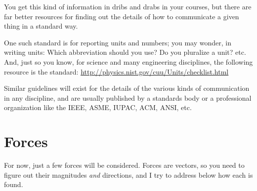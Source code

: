 \documentclass[10pt,letterpaper,twoside]{article}
\begin{document}
You get this kind of information in dribs and drabs in your courses, but there are far better resources for finding out the details of how to communicate a given thing in a standard way.

One such standard is for reporting units and numbers; you may wonder, in writing units: Which abbreviation should you use? Do you pluralize a unit? etc.
And, just so you know, for science and many engineering disciplines, the following resource is the standard: \url{http://physics.nist.gov/cuu/Units/checklist.html}

Similar guidelines will exist for the details of the various kinds of communication in any discipline, and are usually published by a standards body or a professional organization like the IEEE, ASME, IUPAC, ACM, ANSI, etc.

\newpage
\section{Forces}
For now, just a few forces will be considered.
Forces are vectors, so you need to figure out their magnitudes \textit{and} directions, and I try to address below how each is found.
\end{document}
